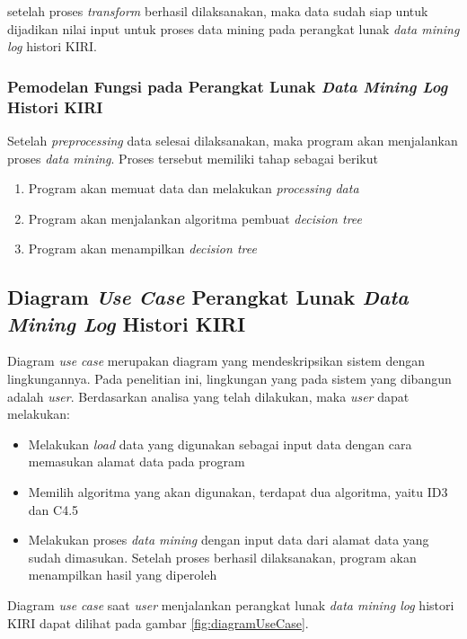 setelah proses \textsl{transform} berhasil dilaksanakan, maka data sudah siap untuk dijadikan nilai input untuk proses data mining pada perangkat lunak \textsl{data mining log} histori KIRI.

\subsubsection{Pemodelan Fungsi pada Perangkat Lunak \textsl{Data Mining Log} Histori KIRI}
Setelah \textsl{preprocessing} data selesai dilaksanakan, maka program akan menjalankan proses \textsl{data mining}. Proses tersebut memiliki tahap sebagai berikut
\begin{enumerate}
	\item Program akan memuat data dan melakukan \textsl{processing data}
	\item Program akan menjalankan algoritma pembuat \textsl{decision tree} 
	\item Program akan menampilkan \textsl{decision tree}
\end{enumerate}  

\subsection{Diagram \textsl{Use Case} Perangkat Lunak \textsl{Data Mining Log} Histori KIRI}

Diagram \textsl{use case} merupakan diagram yang mendeskripsikan sistem dengan lingkungannya. Pada penelitian ini, lingkungan yang pada sistem yang dibangun adalah \textsl{user}. Berdasarkan analisa yang telah dilakukan, maka \textsl{user} dapat melakukan:
\begin{itemize}
	\item Melakukan \textsl{load} data yang digunakan sebagai input data dengan cara memasukan alamat data pada program
	\item Memilih algoritma yang akan digunakan, terdapat dua algoritma, yaitu ID3 dan C4.5
	\item Melakukan proses \textsl{data mining} dengan input data dari alamat data yang sudah dimasukan. Setelah proses berhasil dilaksanakan, program akan menampilkan hasil yang diperoleh
\end{itemize}

Diagram \textsl{use case} saat \textsl{user} menjalankan perangkat lunak \textsl{data mining log} histori KIRI dapat dilihat pada gambar \ref{fig:diagramUseCase}.

